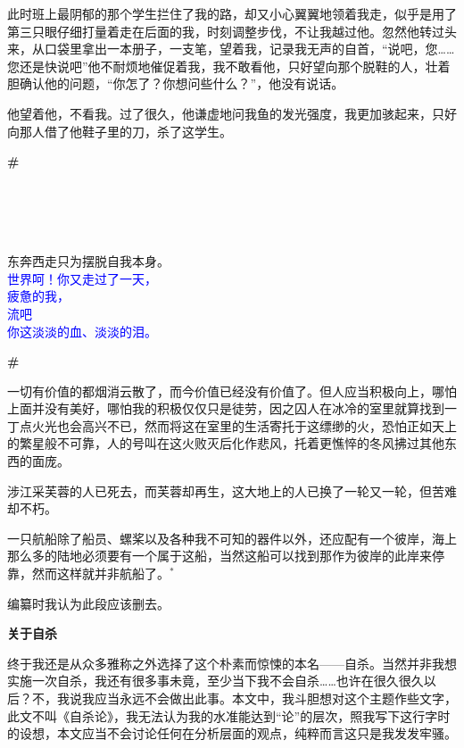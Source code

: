 \documentclass{ctexbook}
\begin{document}
    此时班上最阴郁的那个学生拦住了我的路，却又小心翼翼地领着我走，似乎是用了第三只眼仔细打量着走在后面的我，时刻调整步伐，不让我越过他。忽然他转过头来，从口袋里拿出一本册子，一支笔，望着我，记录我无声的自首，“说吧，您……您还是快说吧”他不耐烦地催促着我，我不敢看他，只好望向那个脱鞋的人，壮着胆确认他的问题，“你怎了？你想问些什么？”，他没有说话。

    他望着他，不看我。过了很久，他谦虚地问我鱼的发光强度，我更加骇起来，只好向那人借了他鞋子里的刀，杀了这学生。

\newpage

\textbf{\#}


\mbox


    \\
    \\
    \\
    \\
    东奔西走只为摆脱自我本身。\\
    \textcolor{blue}
    {世界呵！你又走过了一天，\\
    疲惫的我，\\
    流吧\\
    你这淡淡的血、淡淡的泪。}

\newpage
\textbf{\#}


\mbox


    一切有价值的都烟消云散了，而今价值已经没有价值了。但人应当积极向上，哪怕上面并没有美好，哪怕我的积极仅仅只是徒劳，因之囚人在冰冷的室里就算找到一丁点火光也会高兴不已，然而将这在室里的生活寄托于这缥缈的火，恐怕正如天上的繁星般不可靠，人的号叫在这火败灭后化作悲风，托着更憔悴的冬风拂过其他东西的面庞。

    涉江采芙蓉的人已死去，而芙蓉却再生，这大地上的人已换了一轮又一轮，但苦难却不朽。

    一只航船除了船员、螺桨以及各种我不可知的器件以外，还应配有一个彼岸，海上那么多的陆地必须要有一个属于这船，当然这船可以找到那作为彼岸的此岸来停靠，然而这样就并非航船了。\(^*\)


\mbox


    {\normalsize * 编纂时我认为此段应该删去。}

\newpage
\textbf{关于自杀}


\mbox


    终于我还是从众多雅称之外选择了这个朴素而惊悚的本名——自杀。当然并非我想实施一次自杀，我还有很多事未竟，至少当下我不会自杀……也许在很久很久以后？不，我说我应当永远不会做出此事。本文中，我斗胆想对这个主题作些文字，此文不叫《自杀论》，我无法认为我的水准能达到“论”的层次，照我写下这行字时的设想，本文应当不会讨论任何在分析层面的观点，纯粹而言这只是我发发牢骚。
\end{document}
